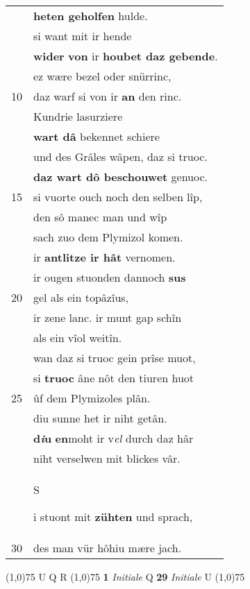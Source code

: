 \documentclass[8pt,a4paper,notitlepage]{article}
\begin{document}
\begin{table}[ht]
\begin{minipage}[t]{0.5\linewidth}
\begin{tabular}{rl}
 & \textbf{heten geholfen} hulde.\\ 
 & si want mit ir hende\\ 
 & \textbf{wider} \textbf{von} ir \textbf{houbet daz gebende}.\\ 
 & ez wære bezel oder snürrinc,\\ 
10 & daz warf si von ir \textbf{an} den rinc.\\ 
 & Kundrie lasurziere\\ 
 & \textbf{wart dâ} bekennet schiere\\ 
 & und des Grâles wâpen, daz si truoc.\\ 
 & \textbf{daz wart dô beschouwet} genuoc.\\ 
15 & si vuorte ouch noch den selben lîp,\\ 
 & den sô manec man und wîp\\ 
 & sach zuo dem Plymizol komen.\\ 
 & ir \textbf{antlitze ir hât} vernomen.\\ 
 & ir ougen stuonden dannoch \textbf{sus}\\ 
20 & gel als ein topâzîus,\\ 
 & ir zene lanc. ir munt gap schîn\\ 
 & als ein vîol weitîn.\\ 
 & wan daz si truoc gein prîse muot,\\ 
 & si \textbf{truoc} âne nôt den tiuren huot\\ 
25 & ûf dem Plymizoles plân.\\ 
 & diu sunne het ir niht getân.\\ 
 & \textbf{d\textit{i}u} \textbf{en}moht ir v\textit{el} durch daz hâr\\ 
 & niht verselwen mit blickes vâr.\\ 
 & \begin{large}S\end{large}i stuont mit \textbf{zühten} und sprach,\\ 
30 & des man vür hôhiu mære jach.\\ 
\end{tabular}
\scriptsize
\line(1,0){75} \newline
U Q R \newline
\line(1,0){75} \newline
\textbf{1} \textit{Initiale} Q  \textbf{29} \textit{Initiale} U  \newline
\line(1,0){75} \newline

\end{minipage}
\end{table}
\end{document}
